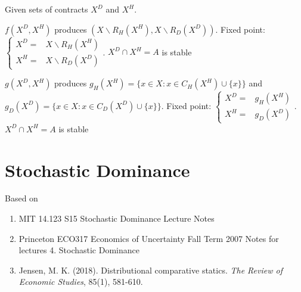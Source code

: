 \documentclass[11pt]{elegantbook}
\begin{document}
Given sets of contracts $X^D$ and $X^H$.

$f(X^D,X^H)$ produces $\left(X\backslash R_H(X^H), X\backslash R_D(X^D)\right)$. Fixed point: $\left\{\begin{matrix}
    X^D=&X\backslash R_H(X^H)\\
    X^H=&X\backslash R_D(X^D)
\end{matrix}\right.$. $X^D\cap X^H=A$ is stable

$g(X^D,X^H)$ produces $g_H(X^H)=\{x\in X: x\in C_H(X^H)\cup\{x\}\}$ and $g_D(X^D)=\{x\in X: x\in C_D(X^D)\cup\{x\}\}$. Fixed point: $\left\{\begin{matrix}
    X^D=&g_H(X^H)\\
    X^H=&g_D(X^D)
\end{matrix}\right.$. $X^D\cap X^H=A$ is stable



\chapter{Stochastic Dominance}
Based on
\begin{enumerate}[$\circ$]
    \item MIT 14.123 S15 Stochastic Dominance Lecture Notes
    \item Princeton ECO317 Economics of Uncertainty Fall Term 2007 Notes for lectures 4. Stochastic Dominance
    \item Jensen, M. K. (2018). Distributional comparative statics. \textit{The Review of Economic Studies}, 85(1), 581-610.
\end{enumerate}
\end{document}
